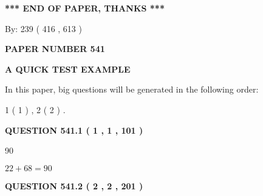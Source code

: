\documentclass[12pt]{article}
\begin{document}
   
   
   
   
\vspace{1.0in} 
{\textbf{\large{ *** END OF PAPER, THANKS *** }}} 
   
   
\hspace{1.0in} By: 
 239 ( 416 ,  613 )
   
   
   
   
\newpage 
\setcounter{page}{ 
   541001 } 
   
   
   
   
 {\textbf{ \Large{ PAPER NUMBER  541  }}}
   
   
\vspace{0.2in}
   
   
   
   
   
   
 \vspace{0.2in}
{\LARGE {\textbf{ A QUICK TEST EXAMPLE}}}
   
   
   
\vspace{0.2in}
   
In this paper, big questions will be generated in the following order: 
   
   
   1 ( 1 )
 ,
   2 ( 2 )
 .
  
\vspace{0.2in}
  
{\textbf{\Large{QUESTION
541.1 
 ( 1 , 1 , 101 )
}}}
  
  
 
 
\noindent{}

90
 
 
 
 
\noindent{}

$ %
22 +  %
68=   %
90$
 
 
  
\vspace{0.2in}
  
{\textbf{\Large{QUESTION
541.2 
 ( 2 , 2 , 201 )
}}}
  
  
 
 
\noindent{}
 
\end{document}
